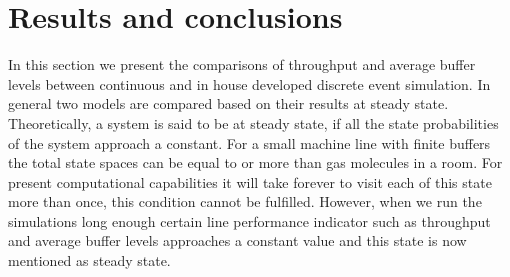 \section{Results and conclusions}
In this section we present the comparisons of throughput and average buffer levels between continuous and in house developed discrete event simulation. In general two models are compared based on their results at steady state. Theoretically, a system is said to be at steady state, if all the state probabilities of the system approach a constant. For a small machine line with finite buffers the total state spaces can be equal to or more than gas molecules in a room. For present computational capabilities it will take forever to visit each of this state more than once, this condition cannot be fulfilled. However, when we run the simulations long enough certain line performance indicator such as throughput and average buffer levels approaches a constant value and this state is now mentioned as steady state.\par
